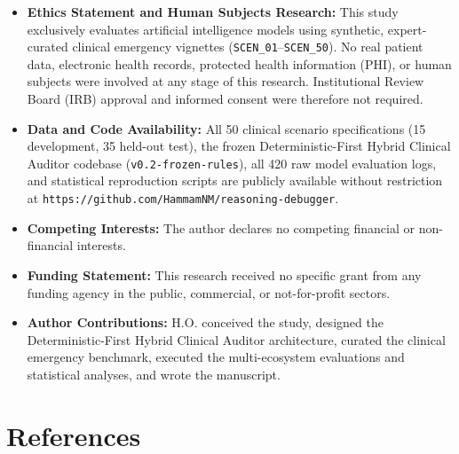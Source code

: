 \documentclass[10pt,a4paper]{article}
\begin{document}
\begin{itemize}
  \item \textbf{Ethics Statement and Human Subjects Research:} This study exclusively evaluates artificial intelligence models using synthetic, expert-curated clinical emergency vignettes (\texttt{SCEN\_\allowbreak{}01}--\texttt{SCEN\_\allowbreak{}50}). No real patient data, electronic health records, protected health information (PHI), or human subjects were involved at any stage of this research. Institutional Review Board (IRB) approval and informed consent were therefore not required.
  \item \textbf{Data and Code Availability:} All 50 clinical scenario specifications (15 development, 35 held-out test), the frozen Deterministic-First Hybrid Clinical Auditor codebase (\texttt{v0.2-frozen-rules}), all 420 raw model evaluation logs, and statistical reproduction scripts are publicly available without restriction at \texttt{https://github.com/HammamNM/reasoning-debugger}.
  \item \textbf{Competing Interests:} The author declares no competing financial or non-financial interests.
  \item \textbf{Funding Statement:} This research received no specific grant from any funding agency in the public, commercial, or not-for-profit sectors.
  \item \textbf{Author Contributions:} H.O. conceived the study, designed the Deterministic-First Hybrid Clinical Auditor architecture, curated the clinical emergency benchmark, executed the multi-ecosystem evaluations and statistical analyses, and wrote the manuscript.
\end{itemize}


\section*{References}
\end{document}
